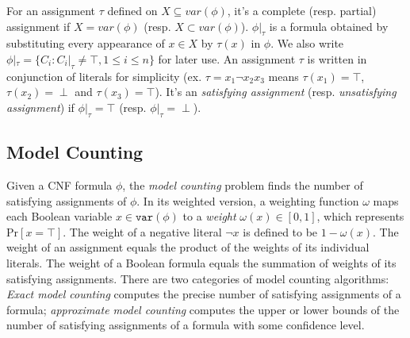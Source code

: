 \documentclass{llncs}
\newtheorem{example}{Example}
\begin{document}
For an assignment $\tau$ defined on $X \subseteq var(\phi)$, it's a complete (resp. partial) assignment if $X = var(\phi)$ (resp. $X \subset var(\phi)$). $\phi|_{\tau}$ is a formula obtained by substituting every appearance of $x \in X$ by $\tau(x)$ in $\phi$. We also write $\phi|_{\tau} = \{C_i : C_i|_{\tau} \neq \top, 1 \leq i \leq n\}$ for later use. An assignment $\tau$ is written in conjunction of literals for simplicity (ex. $\tau = x_1\neg x_2 x_3$ means $\tau(x_1) = \top$, $\tau(x_2) = \perp$ and $\tau(x_3) = \top$). It's an {\it satisfying assignment} (resp. {\it unsatisfying assignment}) if $\phi|_{\tau} = \top$ (resp. $\phi|_{\tau} = \perp$).


\subsection{Model Counting}
Given a CNF formula $\phi$, the \textit{model counting} problem finds the number of satisfying assignments of $\phi$. In its weighted version, a weighting function $\omega$ maps each Boolean variable $x \in \mathtt{var}(\phi)$ to a \textit{weight} $\omega(x) \in [0,1]$, which represents $\mathrm{Pr}[x=\top]$. The weight of a negative literal $\neg x$ is defined to be $1-\omega(x)$. The weight of an assignment equals the product of the weights of its individual literals. The weight of a Boolean formula equals the summation of weights of its satisfying assignments. There are two categories of model counting algorithms: \textit{Exact model counting} computes the precise number of satisfying assignments of a formula; \textit{approximate model counting} computes the upper or lower bounds of the number of satisfying assignments of a formula with some confidence level.
\iffalse
\begin{example}\label{ex:weight}
Consider the same matrix $\phi$ as in Example 1.
Given a weight function where $\omega(x_1) = 0.2$, $\omega(x_2) = 0.3$, $\omega(x_3) = 0.5$. The SAT mintern $x_1x_2\neg x_3$ has weight of $0.03$ and the UNSAT cube $\neg x_1$ has weight of $0.2$. Total weight of $\phi$ is sum of the weight of two satisfying assignments: $\tau_1 = x_1x_2$, $\tau_2 = x_1x_3$, which is $0.16$.
\end{example}
\fi
\end{document}
